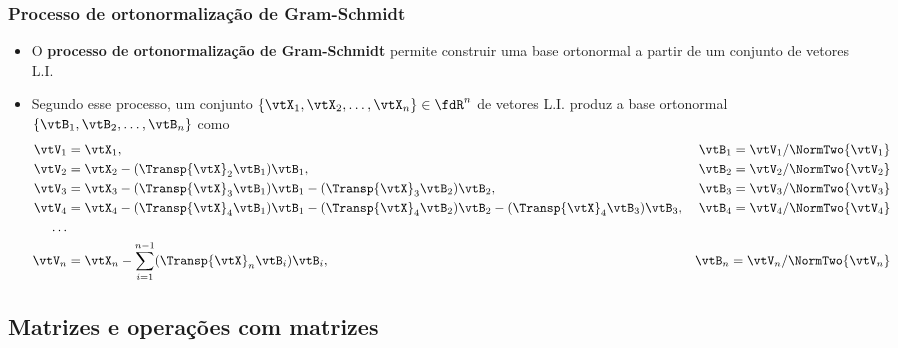 \begin{frame}
  \frametitle{Processo de ortonormalização de Gram-Schmidt}
  \begin{itemize}
    \item O \textbf{\alert{processo de ortonormalização de Gram-Schmidt}} permite construir uma base ortonormal a partir de um conjunto de vetores L.I.
    \item Segundo esse processo, um conjunto $\left\{\vtX_1, \vtX_2, \ldots, \vtX_n\right\} \in \fdR^n$ de vetores L.I. produz a base ortonormal $\left\{\vtB_1, \vtB_2, \ldots, \vtB_n\right\}$ como
    \begin{align*}
      \vtV_1 & = \vtX_1, & \vtB_1 = \vtV_1/\NormTwo{\vtV_1} \\
      \vtV_2 & = \vtX_2 - (\Transp{\vtX}_2\vtB_1)\vtB_1, & \vtB_2 = \vtV_2/\NormTwo{\vtV_2} \\
      \vtV_3 & = \vtX_3 - (\Transp{\vtX}_3\vtB_1)\vtB_1 - (\Transp{\vtX}_3\vtB_2)\vtB_2, & \vtB_3 = \vtV_3/\NormTwo{\vtV_3} \\
      \vtV_4 & = \vtX_4 - (\Transp{\vtX}_4\vtB_1)\vtB_1 - (\Transp{\vtX}_4\vtB_2)\vtB_2 - (\Transp{\vtX}_4\vtB_3)\vtB_3, & \vtB_4 = \vtV_4/\NormTwo{\vtV_4} \\
      \ldots \\
      \vtV_n & = \vtX_n - \sum\limits_{i=1}^{n-1}(\Transp{\vtX}_n\vtB_i)\vtB_i, & \vtB_n = \vtV_n/\NormTwo{\vtV_n} \\
    \end{align*}
  \end{itemize}
\end{frame}

\subsection{Matrizes e operações com matrizes}

